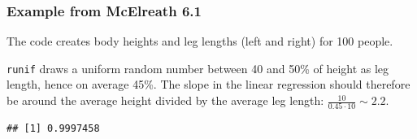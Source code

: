 \documentclass[
]{book}
\newenvironment{Shaded}{\begin{snugshade}}{\end{snugshade}}
\newcommand{\AttributeTok}[1]{\textcolor[rgb]{0.13,0.29,0.53}{#1}}
\newcommand{\DecValTok}[1]{\textcolor[rgb]{0.00,0.00,0.81}{#1}}
\newcommand{\FloatTok}[1]{\textcolor[rgb]{0.00,0.00,0.81}{#1}}
\newcommand{\FunctionTok}[1]{\textcolor[rgb]{0.13,0.29,0.53}{\textbf{#1}}}
\newcommand{\NormalTok}[1]{#1}
\newcommand{\OtherTok}[1]{\textcolor[rgb]{0.56,0.35,0.01}{#1}}
\newcommand{\SpecialCharTok}[1]{\textcolor[rgb]{0.81,0.36,0.00}{\textbf{#1}}}
\begin{document}
\subsubsection{Example from McElreath 6.1}\label{mcElreath_6.1}

The code creates body heights and leg lengths (left and right) for 100 people.

\texttt{runif} draws a uniform random number between 40 and 50\% of height as leg length, hence on average 45\%.
The slope in the linear regression should therefore be around the average height divided by the average leg length:
\(\frac{10}{0.45 \cdot 10} \sim 2.2\).

\begin{Shaded}
\end{Shaded}

\begin{verbatim}
## [1] 0.9997458
\end{verbatim}
\end{document}
